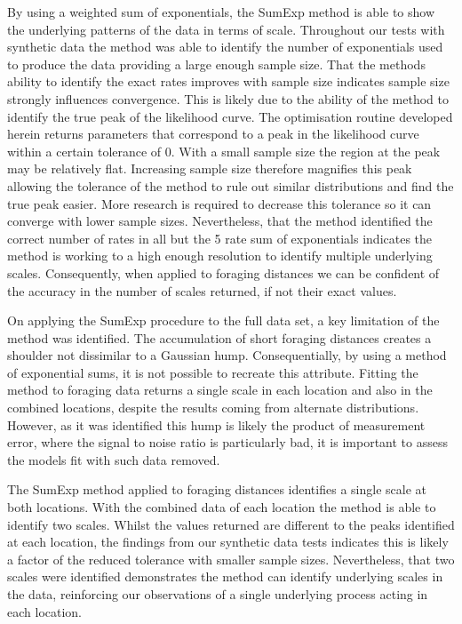 \documentclass[11pt,usenames,dvipsnames,a4paper]{article}
\begin{document}
\begin{linenumbers}
By using a weighted sum of exponentials, the SumExp method is able to show the underlying patterns of the data in terms of scale. Throughout our tests with synthetic data the method was able to identify the number of exponentials used to produce the data providing a large enough sample size. That the methods ability to identify the exact rates improves with sample size indicates sample size strongly influences convergence. This is likely due to the ability of the method to identify the true peak of the likelihood curve. The optimisation routine developed herein returns parameters that correspond to a peak in the likelihood curve within a certain tolerance of 0. With a small sample size the region at the peak may be relatively flat. Increasing sample size therefore magnifies this peak allowing the tolerance of the method to rule out similar distributions and find the true peak easier. More research is required to decrease this tolerance so it can converge with lower sample sizes. Nevertheless, that the method identified the correct number of rates in all but the 5 rate sum of exponentials indicates the method is working to a high enough resolution to identify multiple underlying scales. Consequently, when applied to foraging distances we can be confident of the accuracy in the number of scales returned, if not their exact values. 

On applying the SumExp procedure to the full data set, a key limitation of the method was identified. The accumulation of short foraging distances creates a shoulder not dissimilar to a Gaussian hump. Consequentially, by using a method of exponential sums, it is not possible to recreate this attribute. Fitting the method to foraging data returns a single scale in each location and also in the combined locations, despite the results coming from alternate distributions. However, as it was identified this hump is likely the product of measurement error, where the signal to noise ratio is particularly bad, it is important to assess the models fit with such data removed.

The SumExp method applied to foraging distances identifies a single scale at both locations. With the combined data of each location the method is able to identify two scales. Whilst the values returned are different to the peaks identified at each location, the findings from our synthetic data tests indicates this is likely a factor of the reduced tolerance with smaller sample sizes. Nevertheless, that two scales were identified demonstrates the method can identify underlying scales in the data, reinforcing our observations of a single underlying process acting in each location. 


\end{linenumbers}
\end{document}
